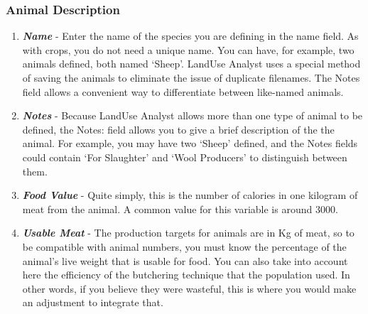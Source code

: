 \subsubsection{Animal Description}
\begin{enumerate}
 	\item \textit{\textbf{Name}} - Enter the name of the species you are defining in the name field. As with crops, you do not need a unique name. You can have, for example, two animals defined, both named `Sheep'. LandUse Analyst uses a special method of saving the animals to eliminate the issue of duplicate filenames. The Notes field allows a convenient way to differentiate between like-named animals. %
	\item \textit{\textbf{Notes}} - Because LandUse Analyst allows more than one type of animal to be defined, the Notes: field allows you to give a brief description of the the animal. For example, you may have two `Sheep' defined, and the Notes fields could contain `For Slaughter' and `Wool Producers' to distinguish between them. 
	\item \textit\textbf{{Food Value}} - Quite simply, this is the number of calories in one kilogram of meat from the animal. A common value for this variable is around 3000. 
	\item \textit{\textbf{Usable Meat}} - The production targets for animals are in Kg of meat, so to be compatible with animal numbers, you must know the percentage of the animal's live weight that is usable for food. You can also take into account here the efficiency of the butchering technique that the population used. In other words, if you believe they were wasteful, this is where you would make an adjustment to integrate that. %


\end{enumerate}
